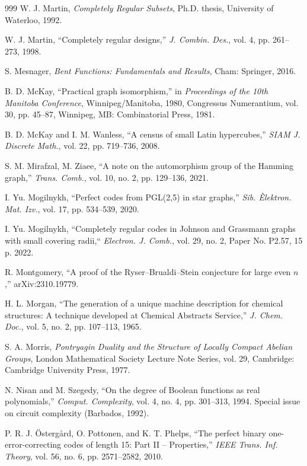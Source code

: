 \documentclass[11pt]{article}
\theoremstyle{definition}
\begin{document}
{{{\begin{thebibliography}{999}
W. J. Martin,
\textit{Completely Regular Subsets},
Ph.D. thesis, University of Waterloo, 1992.

W. J. Martin, ``Completely regular designs,'' \textit{J. Combin. Des.}, vol. 4, pp. 261–273, 1998.


S. Mesnager,
\textit{Bent Functions: Fundamentals and Results},
Cham: Springer, 2016.

B. D. McKay,
``Practical graph isomorphism,''
in \textit{Proceedings of the 10th Manitoba Conference},
Winnipeg/Manitoba, 1980,
Congressus Numerantium, vol. 30, pp. 45--87,
Winnipeg, MB: Combinatorial Press, 1981.

B. D. McKay and I. M. Wanless,
``A census of small Latin hypercubes,''
\textit{SIAM J. Discrete Math.}, vol. 22, pp. 719--736, 2008.

S. M. Mirafzal, M. Ziaee,
``A note on the automorphism group of the Hamming graph,'' 
\textit{Trans. Comb.}, vol. 10,  no. 2, pp. 129--136, 2021.





I. Yu. Mogilnykh,
``Perfect codes from PGL(2,5) in star graphs,''
\textit{Sib. Èlektron. Mat. Izv.}, vol. 17, pp. 534--539, 2020.

I. Yu. Mogilnykh, ``Completely regular codes in Johnson and Grassmann graphs with small covering radii,``
\textit{Electron. J. Comb.}, vol. 29, no. 2, Paper No. P2.57, 15 p. 2022.

R. Montgomery,
``A proof of the Ryser--Brualdi--Stein conjecture for large even $n$,''
arXiv:2310.19779.

H. L. Morgan,
``The generation of a unique machine description for chemical structures: A technique developed at Chemical Abstracts Service,''
\textit{J. Chem. Doc.}, vol. 5, no. 2, pp. 107--113, 1965.

S. A. Morris,
\textit{Pontryagin Duality and the Structure of Locally Compact Abelian Groups},
London Mathematical Society Lecture Note Series, vol. 29,
Cambridge: Cambridge University Press, 1977.

N. Nisan and M. Szegedy,
``On the degree of Boolean functions as real polynomials,''
\textit{Comput. Complexity}, vol. 4, no. 4, pp. 301--313, 1994.
Special issue on circuit complexity (Barbados, 1992).

P. R. J. Östergård, O. Pottonen, and K. T. Phelps,
``The perfect binary one-error-correcting codes of length 15:
Part II -- Properties,''
\textit{IEEE Trans. Inf. Theory}, vol. 56, no. 6, pp. 2571--2582, 2010.


\end{thebibliography}}}}
\end{document}
